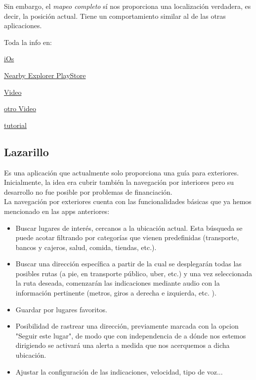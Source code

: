 \documentclass{article}
\begin{document}
	Sin embargo, el \textit{mapeo completo} sí nos proporciona una localización verdadera, es decir, la posición actual. Tiene un comportamiento similar al de las otras aplicaciones.
	
	Toda la info en:
	
	\textcolor{blue}{\href{https://developer.apple.com/accessibility/ios}{iOs}}
	
	\textcolor{blue}{\href{	https://play.google.com/store/apps/details?id=org.aph.nearbyonline&hl=es}{Nearby Explorer PlayStore}}
	
	\textcolor{blue}{\href{https://www.youtube.com/watch?v=Vlc0Pjv4Qro}{Video}}
	
	\textcolor{blue}{\href{https://www.youtube.com/watch?v=f2zE_yEL1Og}{ otro Video}}
	
	\textcolor{blue}{\href{https://www.youtube.com/watch?v=I_cJcOl5MPE}{tutorial}}
	
	\subsection{Lazarillo}
	Es una aplicación que actualmente solo proporciona una guía para exteriores. Inicialmente, la idea era cubrir también la navegación por interiores pero su desarrollo no fue posible por problemas de financiación.
	\\
	La navegación por exteriores cuenta con las funcionalidades básicas que ya hemos mencionado en las apps anteriores: \begin{itemize}
	
	\item Buscar lugares de interés, cercanos a la ubicación actual. Esta búsqueda se puede acotar filtrando por categorías que vienen predefinidas (transporte, bancos y cajeros, salud, comida, tiendas, etc.).
	
	\item Buscar una dirección específica a partir de la cual se desplegarán todas las posibles rutas (a pie, en transporte público, uber, etc.) y una vez seleccionada la ruta deseada, comenzarán las indicaciones mediante audio con la información pertinente (metros, giros a derecha e izquierda, etc. ). 
	
	\item Guardar por lugares favoritos.
	
	\item Posibilidad de rastrear una dirección, previamente marcada con la opcion "Seguir este lugar", de modo que con independencia de a dónde nos estemos dirigiendo se activará una alerta a medida que nos acerquemos a dicha ubicación.
	
	\item Ajustar la configuración de las indicaciones, velocidad, tipo de voz...
	\end{itemize}
	
\end{document}
